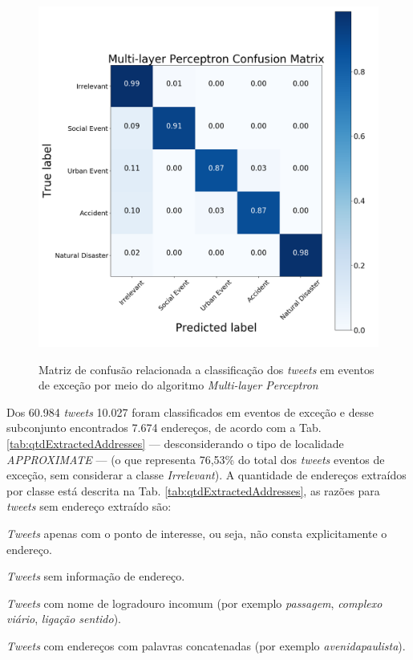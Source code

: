 \documentclass[
	12pt,				%
	oneside,			%
	a4paper,			%
	english,			%
	brazil				%
	]{abntex2ppgsi}
\begin{document}
\begin{figure}[!htb]
	\centering
 	  \caption{Matriz de confusão relacionada a classificação dos \textit{tweets} em eventos de exceção por meio do algoritmo \textit{Multi-layer Perceptron}}
		\includegraphics[width=1\linewidth]{images/confusion_matrix_mpc.png}
	\label{fig:confusion_matrix_mpc}
\end{figure}

Dos 60.984 \textit{tweets} 10.027 foram classificados em eventos de exceção e desse subconjunto encontrados 7.674 endereços, de acordo com a Tab. \ref{tab:qtdExtractedAddresses} --- desconsiderando o tipo de localidade \textit{APPROXIMATE} --- (o que representa 76,53\% do total dos \textit{tweets} eventos de exceção, sem considerar a classe \textit{Irrelevant}). A quantidade de endereços extraídos por classe está descrita na Tab. \ref{tab:qtdExtractedAddresses}, as razões para \textit {tweets} sem endereço extraído são:

\begin{enumerate*}
\item \textit{Tweets} apenas com o ponto de interesse, ou seja, não consta explicitamente o endereço.
\item \textit{Tweets} sem informação de endereço.
\item \textit{Tweets} com nome de logradouro incomum (por exemplo \emph{passagem}, \emph{complexo viário}, \emph{ligação sentido}).
\item \textit{Tweets} com endereços com palavras concatenadas (por exemplo \emph{avenidapaulista}).
\end{enumerate*}
\end{document}
